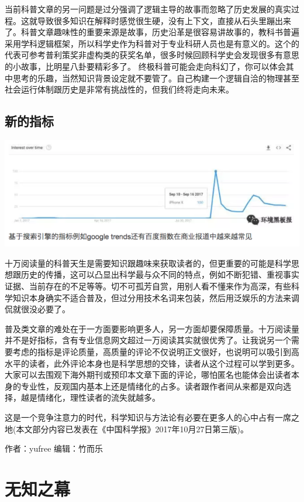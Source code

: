 \documentclass[]{book}
\begin{document}
当前科普文章的另一问题是过分强调了逻辑主导的故事而忽略了历史发展的真实过程。这就导致很多知识在解释时感觉很生硬，没有上下文，直接从石头里蹦出来了。科普文章趣味性的重要来源是故事，历史沿革是很容易讲故事的，教科书普遍采用学科逻辑框架，所以科学史作为科普对于专业科研人员也是有意义的。这个的代表可参考普利策奖非虚构类的获奖名单，很多时候回顾科学史会发现很多有意思的小故事，比明星八卦要精彩多了。
终极科普可能会走向科幻了，你可以体会其中思考的乐趣，当然知识背景设定就不要管了。自己构建一个逻辑自洽的物理甚至社会运行体制跟历史是非常有挑战性的，但我们终将走向未来。

\hypertarget{ux65b0ux7684ux6307ux6807}{%
\subsection{新的指标}\label{ux65b0ux7684ux6307ux6807}}

\includegraphics[width=8.33in]{images/pops8}

十万阅读量的科普天生是需要知识跟趣味来获取读者的，但更重要的可能是科学思想跟历史的传播，这可以凸显出科学最与众不同的特点，例如不断犯错、重视事实证据、当前存在的不足等等。切不可孤芳自赏，用别人看不懂来作为高深，有些科学知识本身确实不适合普及，但过分用技术名词来包装，然后用泛娱乐的方法来调侃就很没必要了。

普及类文章的难处在于一方面要影响更多人，另一方面却要保障质量。十万阅读量并不是好指标，含有专业信息网文超过一万阅读其实就很优秀了。让我说另一个需要考虑的指标是评论质量，高质量的评论不仅说明正文很好，也说明可以吸引到高水平的读者，此外评论本身也是科学思想的交锋，读者从这个过程可以学到更多。大家可以去围观下海外期刊或预印本文章下面的评论，哪怕匿名也能体会出读者本身的专业性，反观国内基本上还是情绪化的占多。读者跟作者间从来都是双向选择，越是情绪化，理性读者的流失就越多。

这是一个竞争注意力的时代，科学知识与方法论有必要在更多人的心中占有一席之地(本文部分内容已发表在《中国科学报》2017年10月27日第三版)。

作者：yufree
编辑：竹而乐

\hypertarget{ux65e0ux77e5ux4e4bux5e55}{%
\section{无知之幕}\label{ux65e0ux77e5ux4e4bux5e55}}
\end{document}
